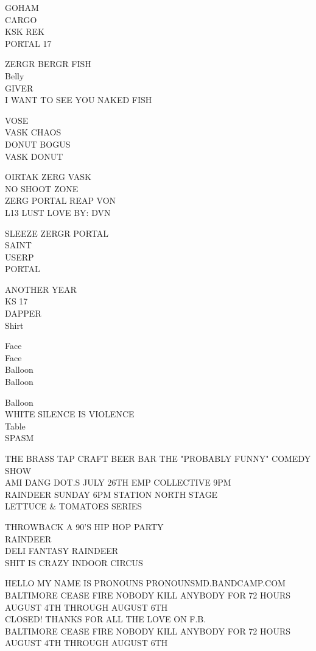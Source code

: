\documentclass[10pt,letterpaper]{article}
\begin{document}
GOHAM\\
CARGO\\
KSK REK\\
PORTAL 17

ZERGR BERGR FISH\\
Belly\\
GIVER\\
I WANT TO SEE YOU NAKED FISH

VOSE\\
VASK CHAOS\\
DONUT BOGUS\\
VASK DONUT

OIRTAK ZERG VASK\\
NO SHOOT ZONE\\
ZERG PORTAL REAP VON\\
L13 LUST LOVE BY: DVN

SLEEZE ZERGR PORTAL\\
SAINT\\
USERP\\
PORTAL

ANOTHER YEAR\\
KS 17\\
DAPPER\\
Shirt

Face\\
Face\\
Balloon\\
Balloon

Balloon\\
WHITE SILENCE IS VIOLENCE\\
Table\\
SPASM

THE BRASS TAP CRAFT BEER BAR THE "PROBABLY FUNNY" COMEDY SHOW\\
AMI DANG DOT.S JULY 26TH EMP COLLECTIVE 9PM\\
RAINDEER SUNDAY 6PM STATION NORTH STAGE\\
LETTUCE \& TOMATOES SERIES

THROWBACK A 90'S HIP HOP PARTY\\
RAINDEER\\
DELI FANTASY RAINDEER\\
SHIT IS CRAZY INDOOR CIRCUS

HELLO MY NAME IS PRONOUNS PRONOUNSMD.BANDCAMP.COM\\
BALTIMORE CEASE FIRE NOBODY KILL ANYBODY FOR 72 HOURS AUGUST 4TH THROUGH AUGUST 6TH\\
CLOSED! THANKS FOR ALL THE LOVE ON F.B.\\
BALTIMORE CEASE FIRE NOBODY KILL ANYBODY FOR 72 HOURS AUGUST 4TH THROUGH AUGUST 6TH
\end{document}
